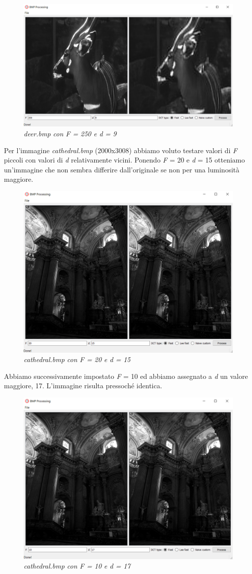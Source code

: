 \documentclass[a4paper,12pt]{report}
\begin{document}
\begin{figure}[H]
\centering
\includegraphics[width=0.8\linewidth]{../img/bambi_250_9.png}
\caption{\textit{deer.bmp con F = 250 e d = 9}}
\end{figure}

\newpage
\noindent Per l'immagine \textit{cathedral.bmp} (2000x3008) abbiamo voluto testare valori di \textit{F} piccoli con valori di \textit{d} relativamente vicini.
Ponendo \textit{F} = 20 e \textit{d} = 15 otteniamo un'immagine che non sembra differire dall'originale se non per una luminosità maggiore.

\begin{figure}[H]
\centering
\includegraphics[width=0.6\linewidth]{../img/cathedral_20_15.png}
\caption{\textit{cathedral.bmp con F = 20 e d = 15}}
\end{figure}

\noindent Abbiamo successivamente impostato \textit{F} = 10 ed abbiamo assegnato a \textit{d} un valore maggiore, 17. L'immagine risulta pressoché identica.

\begin{figure}[H]
\centering
\includegraphics[width=0.6\linewidth]{../img/cathedral_10_17.png}
\caption{\textit{cathedral.bmp con F = 10 e d = 17}}
\end{figure}

\printbibliography
\end{document}
